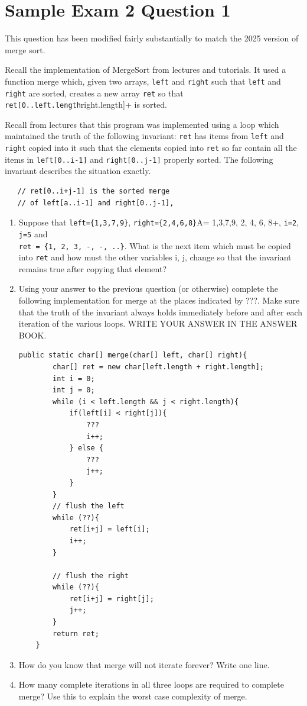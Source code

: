 \documentclass[twoside=false,DIV=14]{scrartcl}
\begin{document}
\section{Sample Exam 2 Question 1}
\begin{note}
This question has been modified fairly substantially to match the 2025 version of merge sort.
\end{note}
Recall the implementation of MergeSort from lectures and tutorials. It used a function merge which, given two arrays, \verb+left+ and \verb+right+ such that \verb+left+ and \verb+right+ are sorted, creates a new array \verb+ret+ so that \verb+ret[0..left.length+right.length]+ is sorted.

Recall from lectures that this program was implemented using a loop which maintained the truth of the following invariant: \verb+ret+ has items from \verb+left+ and \verb+right+ copied into it such that the elements copied into \verb+ret+ so far contain all the items in \verb+left[0..i-1]+ and \verb+right[0..j-1]+ properly sorted. The following invariant describes the situation exactly.

\begin{lstlisting}
   // ret[0..i+j-1] is the sorted merge
   // of left[a..i-1] and right[0..j-1],
\end{lstlisting}
\begin{enumerate}
\item Suppose that \verb+left={1,3,7,9}+, \verb+right={2,4,6,8}+A= {1,3,7,9, 2, 4, 6, 8}+, \verb+i=2+, \verb+j=5+ and \\ \verb+ret = {1, 2, 3, -, -, ..}+. What is the next item which must be copied into \verb+ret+ and how must the other variables i, j, change so that the invariant remains true after copying that element?
\item Using your answer to the previous question (or otherwise) complete the following implementation for merge at the places indicated by ???. Make sure that the truth of the invariant always holds immediately before and after each iteration of the various loops. WRITE YOUR ANSWER IN THE ANSWER BOOK.
\begin{lstlisting}
public static char[] merge(char[] left, char[] right){
        char[] ret = new char[left.length + right.length];
        int i = 0;
        int j = 0;
        while (i < left.length && j < right.length){
            if(left[i] < right[j]){
                ???
                i++;
            } else {
                ???
                j++;                
            }
        }
        // flush the left
        while (??){
            ret[i+j] = left[i];
            i++;
        }

        // flush the right
        while (??){
            ret[i+j] = right[j];
            j++;
        }
        return ret;
    }
\end{lstlisting}
\item How do you know that merge will not iterate forever? Write one line.
\item How many complete iterations in all three loops are required to complete merge? Use this to explain the worst case complexity of merge.
\end{enumerate}
 
\end{document}
